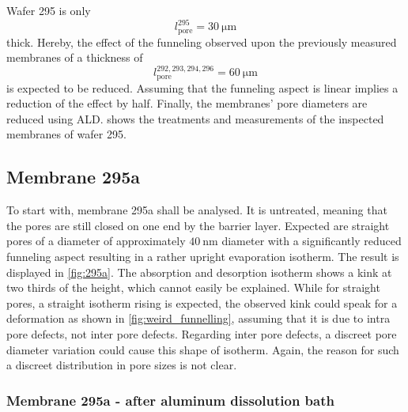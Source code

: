\documentclass[thesis.tex]{subfiles}
\begin{document}
        Wafer 295 is only
        \begin{equation}
            l^{295}_\mathrm{pore}=\SI{30}{\micro\meter}
        \end{equation}
        thick. Hereby, the effect of the funneling observed upon the previously measured membranes of a thickness of
        \begin{equation}
            l^{292,293,294,296}_\mathrm{pore}=\SI{60}{\micro\meter}
        \end{equation}
        is expected to be reduced. Assuming that the funneling aspect is linear implies a reduction of the effect by half.
        Finally, the membranes' pore diameters are reduced using ALD.  shows the treatments and measurements of the inspected membranes of wafer 295.

        

        \subsection{Membrane 295a}

            

            To start with, membrane 295a shall be analysed. It is untreated, meaning that the pores are still closed on one end by the barrier layer. Expected are straight pores of a diameter of approximately
            $\SI{40}{\nano\meter}$ diameter with a significantly reduced funneling aspect resulting in a rather upright evaporation isotherm. The result is displayed in \cref{fig:295a}. The absorption and desorption isotherm shows a kink at two thirds of the height, which cannot easily be explained. While for straight pores, a straight isotherm rising is expected, the observed kink could speak for a deformation as shown in \cref{fig:weird_funnelling}, assuming that it is due to intra pore defects, not inter pore defects. Regarding inter pore defects, a discreet pore diameter variation could cause this shape of isotherm. Again, the reason for such a discreet distribution in pore sizes is not clear.

            


            \subsubsection{Membrane 295a - after aluminum dissolution bath}
\end{document}

